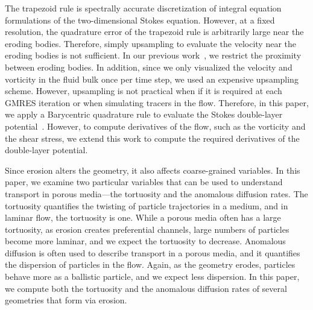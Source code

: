 \documentclass[preprint, 10pt]{elsarticle}
\begin{document}
The trapezoid rule is spectrally accurate discretization of integral
equation formulations of the two-dimensional Stokes equation.  However,
at a fixed resolution, the quadrature error of the trapezoid rule is
arbitrarily large near the eroding bodies.  Therefore, simply upsampling
to evaluate the velocity near the eroding bodies is not sufficient.  In
our previous work~\cite{qua-moo2018}, we restrict the proximity between
eroding bodies.  In addition, since we only visualized the velocity and
vorticity in the fluid bulk once per time step, we used an expensive
upsampling scheme.  However, upsampling is not practical when if it is
required at each GMRES iteration or when simulating tracers in the flow.
Therefore, in this paper, we apply a Barycentric quadrature rule to
evaluate the Stokes double-layer potential~\cite{bar-wu-vee2015}.
However, to compute derivatives of the flow, such as the vorticity and
the shear stress, we extend this work to compute the required
derivatives of the double-layer potential.

Since erosion alters the geometry, it also affects coarse-grained
variables.  In this paper, we examine two particular variables that can
be used to understand transport in porous media---the tortuosity and the
anomalous diffusion rates.   The tortuosity quantifies the twisting of
particle trajectories in a medium, and in laminar flow, the tortuosity
is one.  While a porous media often has a large tortuosity, as erosion
creates preferential channels, large numbers of particles become more
laminar, and we expect the tortuosity to decrease.  Anomalous diffusion
is often used to describe transport in a porous media, and it quantifies
the dispersion of particles in the flow.  Again, as the geometry erodes,
particles behave more as a ballistic particle, and we expect less
dispersion.  In this paper, we compute both the tortuosity and the
anomalous diffusion rates of several geometries that form via erosion.



\end{document}
